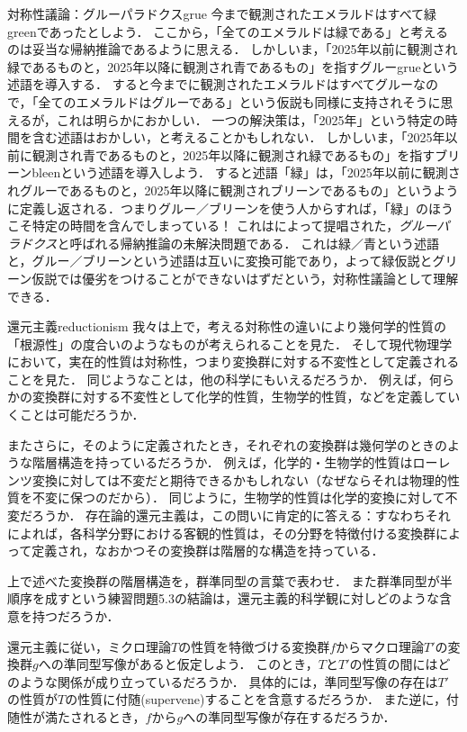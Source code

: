 \documentclass[11pt,a4paper]{jsarticle}
\begin{document}
\begin{rei}{対称性議論：グルーパラドクス}{grue}
今まで観測されたエメラルドはすべて緑greenであったとしよう．
ここから，「全てのエメラルドは緑である」と考えるのは妥当な帰納推論であるように思える．
しかしいま，「2025年以前に観測され緑であるものと，2025年以降に観測され青であるもの」を指すグルーgrueという述語を導入する．
すると今までに観測されたエメラルドはすべてグルーなので，「全てのエメラルドはグルーである」という仮説も同様に支持されそうに思えるが，これは明らかにおかしい．
一つの解決策は，「2025年」という特定の時間を含む述語はおかしい，と考えることかもしれない．
しかしいま，「2025年以前に観測され青であるものと，2025年以降に観測され緑であるもの」を指すブリーンbleenという述語を導入しよう．
すると述語「緑」は，「2025年以前に観測されグルーであるものと，2025年以降に観測されブリーンであるもの」というように定義し返される．つまりグルー／ブリーンを使う人からすれば，「緑」のほうこそ特定の時間を含んでしまっている！
これは\cite{Goodman1955-nr}によって提唱された，\emph{グルーパラドクス}と呼ばれる帰納推論の未解決問題である．
これは緑／青という述語と，グルー／ブリーンという述語は互いに変換可能であり，よって緑仮説とグリーン仮説では優劣をつけることができないはずだという，対称性議論として理解できる．
\end{rei}

\begin{rei}{還元主義}{reductionism}
我々は上で，考える対称性の違いにより幾何学的性質の「根源性」の度合いのようなものが考えられることを見た．
そして現代物理学において，実在的性質は対称性，つまり変換群に対する不変性として定義されることを見た．
同じようなことは，他の科学にもいえるだろうか．
例えば，何らかの変換群に対する不変性として化学的性質，生物学的性質，などを定義していくことは可能だろうか．

またさらに，そのように定義されたとき，それぞれの変換群は幾何学のときのような階層構造を持っているだろうか．
例えば，化学的・生物学的性質はローレンツ変換に対しては不変だと期待できるかもしれない（なぜならそれは物理的性質を不変に保つのだから）．
同じように，生物学的性質は化学的変換に対して不変だろうか．
存在論的還元主義は，この問いに肯定的に答える：すなわちそれによれば，各科学分野における客観的性質は，その分野を特徴付ける変換群によって定義され，なおかつその変換群は階層的な構造を持っている．
\end{rei}

\begin{renshu}{}{}
上で述べた変換群の階層構造を，群準同型の言葉で表わせ．
また群準同型が半順序を成すという練習問題5.3の結論は，還元主義的科学観に対しどのような含意を持つだろうか．
\end{renshu}

\begin{renshu}{}{}
還元主義に従い，ミクロ理論$T$の性質を特徴づける変換群$f$からマクロ理論$T'$の変換群$g$への準同型写像があると仮定しよう．
このとき，$T$と$T'$の性質の間にはどのような関係が成り立っているだろうか．
具体的には，準同型写像の存在は$T'$の性質が$T$の性質に付随(supervene)することを含意するだろうか．
また逆に，付随性が満たされるとき，$f$から$g$への準同型写像が存在するだろうか．
\end{renshu}




\end{document}

